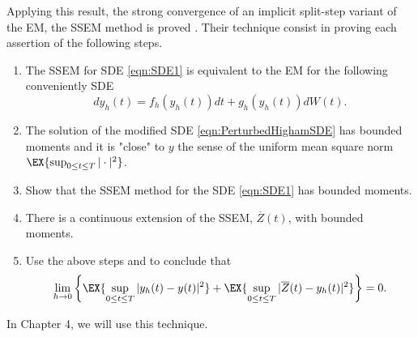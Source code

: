 	Applying this result, the strong convergence of an implicit split-step variant of the EM, the
SSEM method is proved . 
Their technique consist in proving each assertion of the following steps.
\begin{enumerate}[\bf{Step} 1:]
	\item
		\label{stp:EMCorrespondence}
		The SSEM for SDE \eqref{eqn:SDE1} is equivalent to the EM for the following conveniently SDE
		\begin{equation}\label{eqn:PerturbedHighamSDE}
			dy_h(t)= f_h(y_h(t))dt +g_h(y_h(t))dW(t).
		\end{equation}
	\item\label{stp:PerturbedSolution}
			The solution of the modified SDE \eqref{eqn:PerturbedHighamSDE} has bounded moments and it is 
			"close" to  $y$ the sense of the uniform mean square norm 
			$
				\EX{\sup_{0\leq t\leq T}|\cdot|^2}
			$.
	\item
	\label{stp:MethodBoundedMoments}
		Show that the SSEM method for the SDE \eqref{eqn:SDE1} has bounded moments.
	\item
		There is a continuous extension of the SSEM, $\overline{Z}(t)$, with bounded moments.
	\item
		Use the above steps and  to conclude that
		\begin{equation}
			\lim_{h\to 0}
			\left\{
				\EX{\sup_{0\leq t\leq T}|y_h(t)-y(t)|^2}
			+
			\EX{\sup_{0\leq t\leq T}|\overline{Z}(t) -y_h(t)|^2}
			\right\}=0.
		\end{equation}
\end{enumerate}
In Chapter 4, we will use this technique.
%